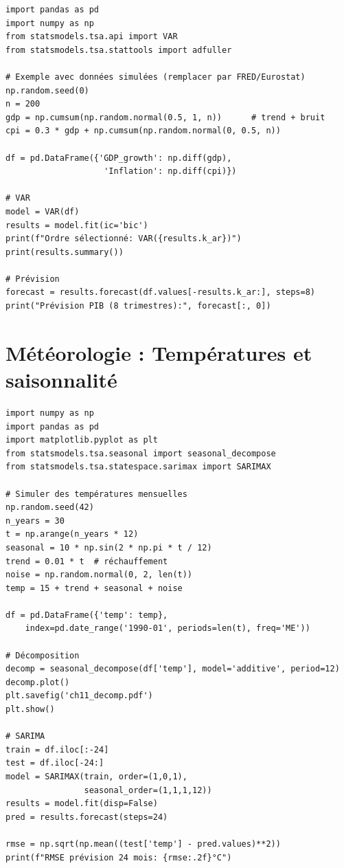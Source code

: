 \begin{codeblock}[title=\textbf{Python --- Pr\'evision macro}]
\begin{verbatim}
import pandas as pd
import numpy as np
from statsmodels.tsa.api import VAR
from statsmodels.tsa.stattools import adfuller

# Exemple avec données simulées (remplacer par FRED/Eurostat)
np.random.seed(0)
n = 200
gdp = np.cumsum(np.random.normal(0.5, 1, n))      # trend + bruit
cpi = 0.3 * gdp + np.cumsum(np.random.normal(0, 0.5, n))

df = pd.DataFrame({'GDP_growth': np.diff(gdp),
                    'Inflation': np.diff(cpi)})

# VAR
model = VAR(df)
results = model.fit(ic='bic')
print(f"Ordre sélectionné: VAR({results.k_ar})")
print(results.summary())

# Prévision
forecast = results.forecast(df.values[-results.k_ar:], steps=8)
print("Prévision PIB (8 trimestres):", forecast[:, 0])
\end{verbatim}
\end{codeblock}

\section{M\'et\'eorologie : Temp\'eratures et saisonnalit\'e}

\begin{codeblock}[title=\textbf{Python --- S\'erie de temp\'eratures}]
\begin{verbatim}
import numpy as np
import pandas as pd
import matplotlib.pyplot as plt
from statsmodels.tsa.seasonal import seasonal_decompose
from statsmodels.tsa.statespace.sarimax import SARIMAX

# Simuler des températures mensuelles
np.random.seed(42)
n_years = 30
t = np.arange(n_years * 12)
seasonal = 10 * np.sin(2 * np.pi * t / 12)
trend = 0.01 * t  # réchauffement
noise = np.random.normal(0, 2, len(t))
temp = 15 + trend + seasonal + noise

df = pd.DataFrame({'temp': temp},
    index=pd.date_range('1990-01', periods=len(t), freq='ME'))

# Décomposition
decomp = seasonal_decompose(df['temp'], model='additive', period=12)
decomp.plot()
plt.savefig('ch11_decomp.pdf')
plt.show()

# SARIMA
train = df.iloc[:-24]
test = df.iloc[-24:]
model = SARIMAX(train, order=(1,0,1),
                seasonal_order=(1,1,1,12))
results = model.fit(disp=False)
pred = results.forecast(steps=24)

rmse = np.sqrt(np.mean((test['temp'] - pred.values)**2))
print(f"RMSE prévision 24 mois: {rmse:.2f}°C")
\end{verbatim}
\end{codeblock}

